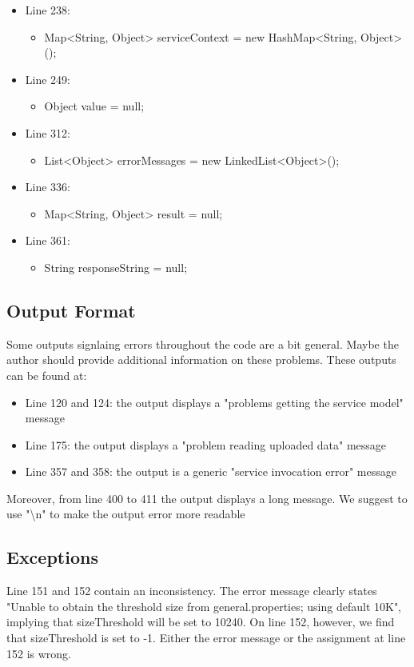 \documentclass{article}
\begin{document}
\begin{itemize}[noitemsep]
\item Line 238:
\begin{itemize}[noitemsep]
\item Map<String, Object> serviceContext = new HashMap<String, Object>();
\end{itemize} 
\item Line 249: 
\begin{itemize}[noitemsep]
\item Object value = null;
\end{itemize}
\item Line 312:
\begin{itemize}[noitemsep]
\item List<Object> errorMessages = new LinkedList<Object>();
\end{itemize}
\item Line 336: 
\begin{itemize}[noitemsep]
\item Map<String, Object> result = null;
\end{itemize}
\item Line 361:
\begin{itemize}[noitemsep]
\item String responseString = null;
\end{itemize}
\end{itemize}
\subsection{Output Format}
Some outputs signlaing errors throughout the code are a bit general. Maybe the author should provide additional information on these problems. These outputs can be found at:
\begin{itemize}[noitemsep]
\item Line 120 and 124: the output displays a "problems getting the service model" message
\item Line 175: the output displays a "problem reading uploaded data" message
\item Line 357 and 358: the output is a generic "service invocation error" message
\end{itemize}
Moreover, from line 400 to 411 the output displays a long message. We suggest to use "\textbackslash n" to make the output error more readable
\subsection{Exceptions}
Line 151 and 152 contain an inconsistency. The error message clearly states "Unable to obtain the threshold size from general.properties; using default 10K", implying that sizeThreshold will be set to 10240. On line 152, however, we find that sizeThreshold is set to -1. Either the error message or the assignment at line 152 is wrong.\\
\end{document}

